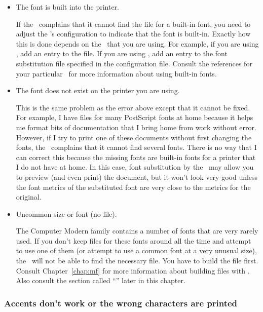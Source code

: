 \begin{itemize}
\item The font is built into the printer.

If the \dvidriver\ complains that it cannot find the  file
for a built-in font, you need to adjust the \dvidriver's configuration
to indicate that the font is built-in.
Exactly how this 
is done depends on the \dvidriver\ that you are using.  For example,
if you are using , add an entry to the 
file.  If you are using \emTeX, add an entry to 
the font substitution
file specified in the configuration file.  Consult the
references for your particular \dvidriver\ for more information about
using built-in fonts.

\item The font does not exist on the printer you are using.

This is the same problem as the error above except that it cannot be
fixed.  For example, I have  files for many PostScript fonts
at home because it helps me format bits of documentation that I bring
home from work without error.  However, if I try to print one of these
documents without first changing the fonts, the \dvidriver\ complains
that it cannot find several fonts.  There is no way that I can
correct this because the missing fonts are built-in fonts for a printer
that I do not have at home.  In this case, font substitution by the
\dvidriver\ may allow you to preview (and even print) the document,
but it won't look very good unless the font metrics of the substituted
font are very close to the metrics for the original.

\item Uncommon size or font (no  file).

The Computer Modern family contains a number of fonts that are very
rarely used.  If you don't keep  files for these fonts around
all the time and attempt to use one of them (or attempt to use
a common font at a very unusual size), the \dvidriver\ will not be
able to find the necessary  file.  You have to build the 
 file first.  Consult Chapter~\ref{chap:mf}
for more information about building 
files with \MF.  Also consult the section called ``''
later in this chapter.
\end{itemize}

\subsubsection{Accents don't work or the wrong characters are printed}

